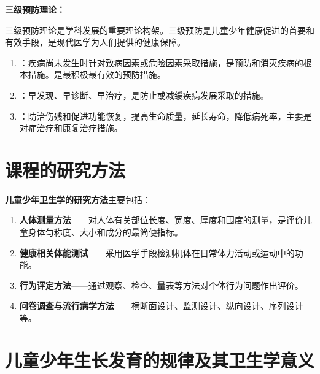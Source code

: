 \begin{keybox}
\textbf{三级预防理论：}

三级预防理论是学科发展的重要理论构架。三级预防是儿童少年健康促进的首要和有效手段，是现代医学为人们提供的健康保障。

\begin{enumerate}[leftmargin=*]
    \item {}：疾病尚未发生时针对致病因素或危险因素采取措施，是预防和消灭疾病的根本措施。是最积极最有效的预防措施。

    \item {}：早发现、早诊断、早治疗，是防止或减缓疾病发展采取的措施。

    \item {}：防治伤残和促进功能恢复，提高生命质量，延长寿命，降低病死率，主要是对症治疗和康复治疗措施。
\end{enumerate}
\end{keybox}

\section{课程的研究方法}

\begin{tipbox}
\textbf{儿童少年卫生学的研究方法}主要包括：

\begin{enumerate}[leftmargin=*]
    \item \textbf{人体测量方法}——对人体有关部位长度、宽度、厚度和围度的测量，是评价儿童身体匀称度、大小和成分的最简便指标。
    \item \textbf{健康相关体能测试}——采用医学手段检测机体在日常体力活动或运动中的功能。
    \item \textbf{行为评定方法}——通过观察、检查、量表等方法对个体行为问题作出评价。
    \item \textbf{问卷调查与流行病学方法}——横断面设计、监测设计、纵向设计、序列设计等。
\end{enumerate}
\end{tipbox}

\section{儿童少年生长发育的规律及其卫生学意义}\difficulty

